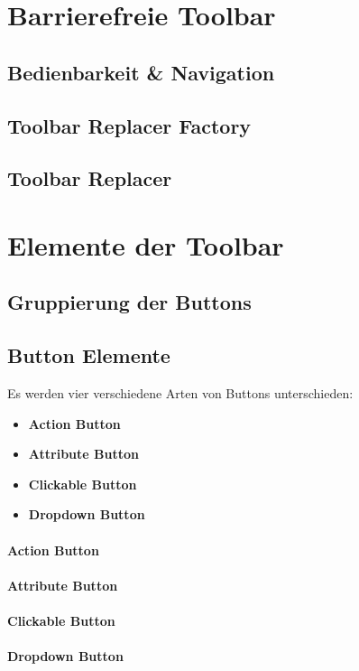 \section{Barrierefreie Toolbar}
\subsection{Bedienbarkeit \& Navigation}

\subsection{Toolbar Replacer Factory}

\subsection{Toolbar Replacer}

\section{Elemente der Toolbar}
\subsection{Gruppierung der Buttons}

\subsection{Button Elemente}
\label{subsec:buttons}
Es werden vier verschiedene Arten von Buttons unterschieden: 

\begin{itemize}
	\item{\textbf{Action Button}}
	\item{\textbf{Attribute Button}}
	\item{\textbf{Clickable Button}}
	\item{\textbf{Dropdown Button}}
\end{itemize}

\paragraph{Action Button}

\paragraph{Attribute Button}

\paragraph{Clickable Button}

\paragraph{Dropdown Button}
\label{dropdown_button}
